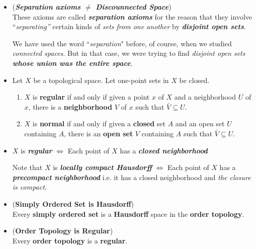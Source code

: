 \documentclass[11pt]{article}
\begin{document}
\begin{itemize}
\item \begin{remark} (\emph{\textbf{Separation axioms $\neq$ Discounnected Space}})\\
These axioms are called \emph{\textbf{separation axioms}} for the reason that they involve ``\emph{separating”} certain kinds of \emph{sets from one another} by \emph{\textbf{disjoint open sets}}. 

We have used the word ``\emph{separation}" before, of course, when we studied \emph{connected spaces}. But in that case, we were trying to find \emph{disjoint open sets} \emph{\textbf{whose union was the entire space}}.
\end{remark}

\item \begin{lemma}
Let $X$ be a topological space. Let one-point sets in $X$ be closed.
\begin{enumerate}
\item $X$ is \textbf{regular} if and only if given a point $x$ of $X$ and a neighborhood $U$ of $x$,
there is a \textbf{neighborhood} $V$ of $x$ such that $\bar{V} \subseteq U$.
\item $X$ is \textbf{normal} if and only if given a \textbf{closed} set $A$ and an open set $U$ containing $A$,
there is an \textbf{open set} $V$ containing $A$ such that $\bar{V}\subseteq U$.
\end{enumerate}
\end{lemma}

\item \begin{remark}
$X$ is \emph{\textbf{regular}} $\Leftrightarrow$  Each point of $X$ has a \textbf{\emph{closed neighborhood}}

Note that $X$  is \emph{\textbf{locally compact Hausdorff}} $\Leftrightarrow$ Each point of $X$ has a \textbf{\emph{precompact neighborhood}} i.e. it has a closed neighborhood and \emph{the closure is compact}.
\end{remark}

\item \begin{proposition} (\textbf{Simply Ordered Set is Hausdorff}) \citep{munkres2000topology} \\
Every \textbf{simply ordered set} is a \textbf{Hausdorff} space in the \textbf{order topology}. 
\end{proposition}

\item \begin{proposition} (\textbf{Order Topology is Regular}) \citep{munkres2000topology} \\
Every \textbf{order topology} is a \textbf{regular}. 
\end{proposition}


\end{itemize}
\end{document}
